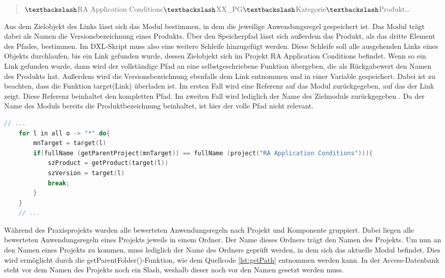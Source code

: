 \begin{quotation}
    $\textbackslash$RA Application Conditions$\textbackslash$XX\_PG$\textbackslash$Kategorie$\textbackslash$Produkt\dots
\end{quotation}

Aus dem Zielobjekt des Links lässt sich das Modul bestimmen, in dem die jeweilige Anwendungsregel gespeichert ist. Das Modul trägt dabei als Namen die Versionsbezeichnung eines Produkts.
Über den Speicherpfad lässt sich außerdem das Produkt, als das dritte Element des Pfades, bestimmen. Im \ac{DXL}-Skript muss also eine weitere Schleife hinzugefügt werden.
Diese Schleife soll alle ausgehenden Links eines Objekts durchlaufen, bis ein Link gefunden wurde, dessen Zielobjekt sich im Projekt RA Application Conditions befindet.
Wenn so ein Link gefunden wurde, dann wird der vollständige Pfad an eine selbstgeschriebene Funktion übergeben, die als Rückgabewert den Namen des Produkts hat.
Außerdem wird die Versionsbezeichnung ebenfalls dem Link entnommen und in einer Variable gespeichert. Dabei ist zu beachten, dass die Funktion target(Link) überladen ist.
Im ersten Fall wird eine Referenz auf das Modul zurückgegeben, auf das der Link zeigt. Diese Referenz beinhaltet den kompletten Pfad. Im zweiten Fall wird lediglich der Name des Zielmoduls 
zurückgegeben \cite[vgl. S.391]{DXL}. Da der Name des Moduls bereits die Produktbezeichnung beinhaltet, ist hier der volle Pfad nicht relevant.

\begin{lstlisting}[language = C++, caption={Produkt- und Versionsbezeichnung bestimmen},captionpos=b, label = lst:getProductVersion, float, floatplacement=H]
    // ...
    for l in all o -> "*" do{
        mnTarget = target(l)
        if(fullName (getParentProject(mnTarget)) == fullName (project("RA Application Conditions"))){
            szProduct = getProduct(target(l)) 
            szVersion = target(l)
            break;
        } 
    }
    // ...
\end{lstlisting}

Während des Praxisprojekts wurden alle bewerteten Anwendungsregeln nach Projekt und Komponente gruppiert. Dabei liegen alle bewerteten Anwendungsregeln eines Projekts jeweils in einem Ordner.
Der Name dieses Ordners trägt den Namen des Projekts. Um nun an den Namen eines Projekts zu kommen, muss lediglich der Name des Ordners geprüft werden, in dem sich das aktuelle Modul befindet.
Dies wird ermöglicht durch die getParentFolder()-Funktion, wie dem Quellcode \ref*{lst:getPath} entnommen werden kann. In der Access-Datenbank steht vor dem Namen des Projekts noch ein 
Slash, weshalb dieser noch vor den Namen gesetzt werden muss.

